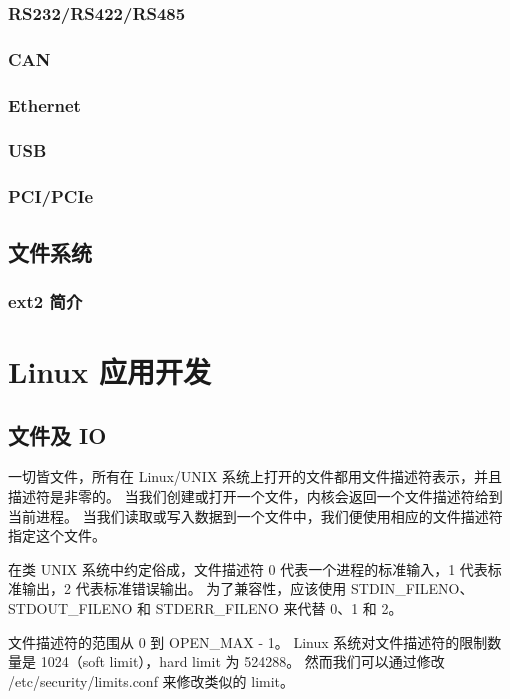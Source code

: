 \subsubsection{RS232/RS422/RS485}

\subsubsection{CAN}

\subsubsection{Ethernet}

\subsubsection{USB}

\subsubsection{PCI/PCIe}

\subsection{文件系统}

\subsubsection{ext2 简介}

\section{Linux 应用开发}

\subsection{文件及 IO}

一切皆文件，所有在 Linux/UNIX 系统上打开的文件都用文件描述符表示，并且描述符是非零的。
当我们创建或打开一个文件，内核会返回一个文件描述符给到当前进程。
当我们读取或写入数据到一个文件中，我们便使用相应的文件描述符指定这个文件。

在类 UNIX 系统中约定俗成，文件描述符 0 代表一个进程的标准输入，1 代表标准输出，2 代表标准错误输出。
为了兼容性，应该使用 STDIN\_FILENO、STDOUT\_FILENO 和 STDERR\_FILENO 来代替 0、1 和 2。

文件描述符的范围从 0 到 OPEN\_MAX - 1。
Linux 系统对文件描述符的限制数量是 1024（soft limit），hard limit 为 524288。
然而我们可以通过修改 /etc/security/limits.conf 来修改类似的 limit。

